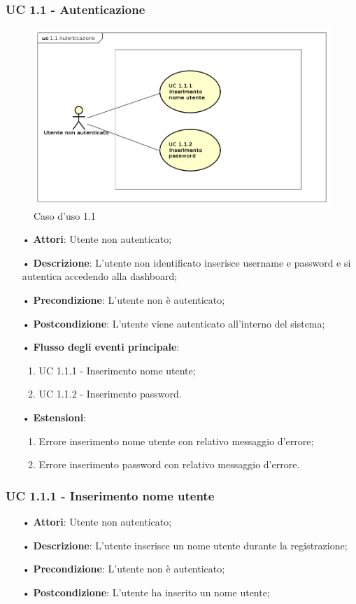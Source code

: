 \subsubsection{UC 1.1 - Autenticazione}
\begin{figure}[H]
\centering
\includegraphics[width=17cm]{img/UC11.png} 
\caption{Caso d'uso 1.1}\label{fig:11}
\end{figure}
\begin{itemize}
\item[•]\textbf{Attori}: Utente non autenticato;
\item[•]\textbf{Descrizione}:  L’utente non identificato inserisce username e password e si autentica accedendo alla dashboard;
\item[•]\textbf{Precondizione}: L’utente non è autenticato;
\item[•]\textbf{Postcondizione}: L’utente viene autenticato all’interno del sistema;
\item[•]\textbf{Flusso degli eventi principale}:
\begin{enumerate}
\item UC 1.1.1 - Inserimento nome utente;
\item UC 1.1.2 - Inserimento password.
\end{enumerate}
\item[•]\textbf{Estensioni}:
\begin{enumerate}
\item Errore inserimento nome utente con relativo messaggio d’errore;
\item Errore inserimento password con relativo messaggio d’errore.
\end{enumerate}
\end{itemize}

\subsubsection{UC 1.1.1 - Inserimento nome utente}
\begin{itemize}
\item[•]\textbf{Attori}: Utente non autenticato;
\item[•]\textbf{Descrizione}: L’utente inserisce un nome utente durante la registrazione;
\item[•]\textbf{Precondizione}: L’utente non è autenticato;
\item[•]\textbf{Postcondizione}: L’utente ha inserito un nome utente;
\end{itemize}

